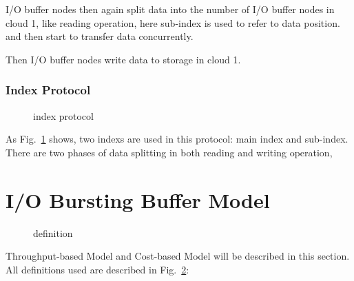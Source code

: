 \documentclass[JIP,draft]{ipsj}
\begin{document}
I/O buffer nodes then again split data into the number of I/O buffer nodes in cloud 1, like reading operation, here sub-index is used to refer to data position. and then start to transfer data concurrently. 

Then I/O buffer nodes write data to storage in cloud 1.

\subsubsection{Index Protocol}

\begin{figure}[tb]
	\centering
	\caption{index protocol}
	\label{index protocol}
\end{figure}

As Fig.~\ref{index protocol} shows, two indexs are used in this protocol: main index and sub-index.
There are two phases of data splitting in both reading and writing operation, 

\section{I/O Bursting Buffer Model}

\begin{figure}[tb]
	\centering
	\caption{definition}
	\label{definition}
\end{figure}

Throughput-based Model and Cost-based Model will be described in this section.
All definitions used are described in Fig.~\ref{definition}:
\end{document}

